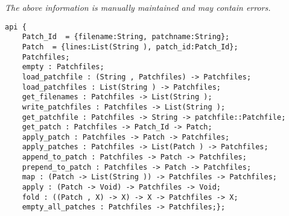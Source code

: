 \label{api:Patchfiles}

{\tiny \it The above information is manually maintained and may contain errors.}
\begin{verbatim}
api {
    Patch_Id  = {filename:String, patchname:String};
    Patch  = {lines:List(String ), patch_id:Patch_Id};
    Patchfiles;
    empty : Patchfiles;
    load_patchfile : (String , Patchfiles) -> Patchfiles;
    load_patchfiles : List(String ) -> Patchfiles;
    get_filenames : Patchfiles -> List(String );
    write_patchfiles : Patchfiles -> List(String );
    get_patchfile : Patchfiles -> String -> patchfile::Patchfile;
    get_patch : Patchfiles -> Patch_Id -> Patch;
    apply_patch : Patchfiles -> Patch -> Patchfiles;
    apply_patches : Patchfiles -> List(Patch ) -> Patchfiles;
    append_to_patch : Patchfiles -> Patch -> Patchfiles;
    prepend_to_patch : Patchfiles -> Patch -> Patchfiles;
    map : (Patch -> List(String )) -> Patchfiles -> Patchfiles;
    apply : (Patch -> Void) -> Patchfiles -> Void;
    fold : ((Patch , X) -> X) -> X -> Patchfiles -> X;
    empty_all_patches : Patchfiles -> Patchfiles;};
\end{verbatim}
